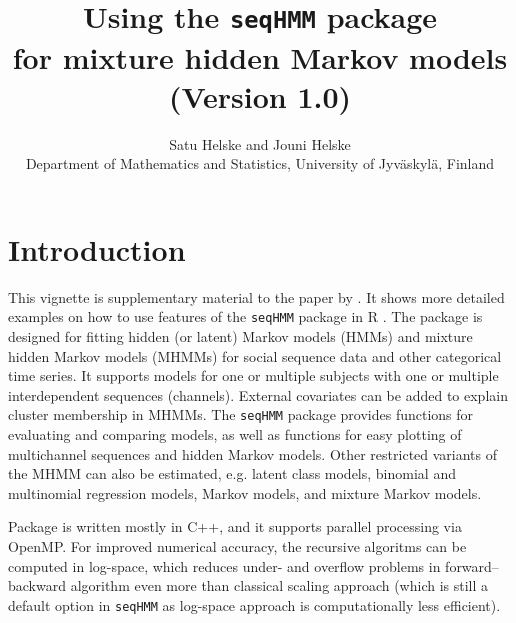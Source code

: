 \documentclass[12pt]{article}\usepackage[]{graphicx}\usepackage[]{color}
\begin{document}
\def\spacingset#1{\renewcommand{\baselinestretch}%
{#1}\small\normalsize} \spacingset{1}



  \title{\bf Using the \texttt{seqHMM} package \\
  for mixture hidden Markov models \\
  \large (Version 1.0)}
  \author{Satu Helske
    and
    Jouni Helske \\
    Department of Mathematics and Statistics, University of Jyv{\"a}skyl{\"a}, Finland}




\maketitle

\tableofcontents

\bigskip

\spacingset{1.45}

\section{Introduction}

This vignette is supplementary material to the paper by \citet{HelskeHelske}. It shows more detailed examples on how to use features of the \texttt{seqHMM} package in R \citep{RCoreTeam2015}. The package is designed for fitting hidden (or latent) Markov models (HMMs) and mixture hidden Markov models (MHMMs) for social sequence data and other categorical time series. It supports models for one or multiple subjects with one or multiple interdependent sequences (channels). External covariates can be added to explain cluster membership in MHMMs. The \texttt{seqHMM} package provides functions for evaluating and comparing models, as well as functions for easy plotting of multichannel sequences and hidden Markov models. Other restricted variants of the MHMM can also be estimated, e.g. latent class models, binomial and multinomial regression models, Markov models, and mixture Markov models.

Package is written mostly in C++, and it supports parallel processing via OpenMP. For improved numerical accuracy, the recursive algoritms can be computed in log-space, which reduces under- and overflow problems in forward--backward algorithm even more than classical scaling approach (which is still a default option in \texttt{seqHMM} as log-space approach is computationally less efficient).
\end{document}
